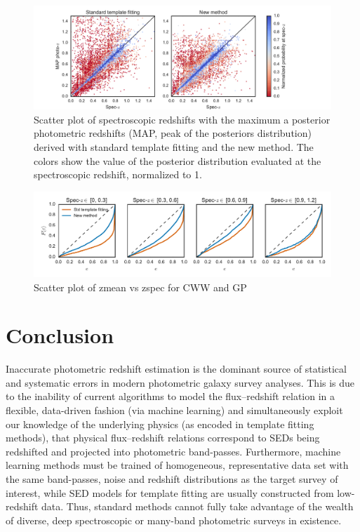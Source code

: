 \documentclass[aps,prd,showpacs,superscriptaddress,groupedaddress]{revtex4}  %
\begin{document}
\begin{figure}
\includegraphics[width=16cm, trim = 1.8cm 0cm 3.5cm 0cm, clip]{zmean_vs_zspec.pdf}
\caption{Scatter plot of spectroscopic redshifts with the maximum a posterior photometric redshifts (MAP, peak of the posteriors distribution) derived with standard template fitting and the new method. The colors show the value of the posterior distribution evaluated at the spectroscopic redshift, normalized to 1.}
\label{fig:zmean_vs_zspec}
\end{figure}

\begin{figure}
\includegraphics[width=18cm]{cipdfs.pdf}
\caption{Scatter plot of zmean vs zspec for CWW and GP}
\label{fig:cipdfs}
\end{figure}



\section{Conclusion}\label{sec:concl}

Inaccurate photometric redshift estimation is the dominant source of statistical and systematic errors in modern photometric galaxy survey analyses.
This is due to the inability of current \photoz algorithms to model the flux--redshift relation in a flexible, data-driven fashion (\eg via machine learning) and simultaneously exploit our knowledge of the underlying physics (as encoded in template fitting methods), \ie that physical flux--redshift relations correspond to SEDs being redshifted and projected into photometric band-passes. 
Furthermore, machine learning methods must be trained of homogeneous, representative data set with the same band-passes, noise and redshift distributions as the target survey of interest, while SED models for template fitting are usually constructed from low-redshift data.
Thus, standard methods cannot fully take advantage of the wealth of diverse, deep spectroscopic or many-band photometric surveys in existence.
\end{document}

